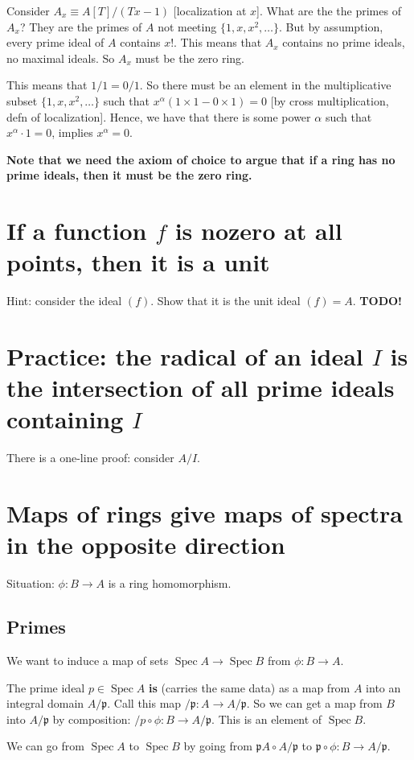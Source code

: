 \documentclass{book}
\newcommand{\spec}{\operatorname{Spec}}
\newcommand{\p}{\mathfrak{p}}
\theoremstyle{definition}
\begin{document}
Consider $A_x \equiv A[T]/(Tx - 1)$ [localization at $x$]. What are the
the primes of $A_x$? They are the primes of $A$ not meeting $\{1, x, x^2, \dots \}$.
But by assumption, every prime  ideal of $A$ contains $x$!. This means that
$A_x$ contains no prime ideals, no maximal ideals. So $A_x$ must be the zero ring.

This means that $1/1 = 0/1$.  So there must be an element in the multiplicative
subset $\{1, x, x^2, \dots \}$ such that $x^\alpha(1\times 1 - 0 \times 1) = 0$ [by cross multiplication, defn of localization].
Hence, we have that there is some power $\alpha$ such that $x^\alpha \cdot 1 = 0$,
implies $x^\alpha = 0$.


\textbf{Note that we need the axiom of choice to argue that if a ring has no prime ideals,
then it must be the zero ring.}

\section{If a function $f$ is nozero at all points, then it is a unit}
Hint: consider the ideal $(f)$. Show that it is the unit ideal $(f) = A$.
\textbf{TODO!}

\section{Practice: the radical of an ideal $I$ is the intersection of all prime ideals containing $I$}
There is a one-line proof: consider $A/I$.
\section{Maps of rings give maps of spectra in the opposite direction}

Situation: $\phi: B \rightarrow A$ is a ring homomorphism. 
\subsection{Primes}
We want to induce a map of sets $\spec A \rightarrow \spec B$ from
$\phi: B \rightarrow A$.

The prime ideal $p \in \spec A$ \textbf{is} (carries the same data) as a map from
$A$ into an integral domain $A/\p$. Call this map $/\p: A \rightarrow A /\p$.
So we can get a map from $B$ into $A/\p$ by composition: $/p \circ \phi : B \rightarrow A/\p$.
This is an element of $\spec B$.

We can go from $\spec A$ to $\spec B$ by going from
$\p A \circ A/\p$ to $\p \circ \phi: B \rightarrow A/\p$.
\end{document}
